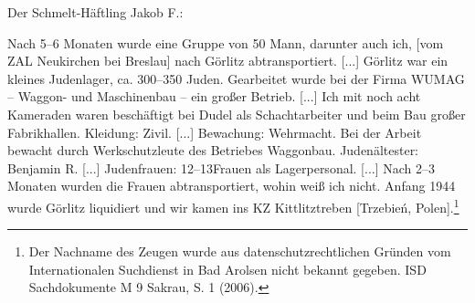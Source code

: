 Der Schmelt-Häftling Jakob F.:
\begin{leftbar}
Nach 5--6 Monaten wurde eine Gruppe von 50 Mann, darunter auch ich, [vom ZAL Neukirchen bei Breslau] nach Görlitz abtransportiert. [...] Görlitz war ein kleines Judenlager, ca. 300--350 Juden. Gearbeitet wurde bei der Firma WUMAG -- Waggon- und Maschinenbau -- ein großer Betrieb. [...] Ich mit noch acht Kameraden waren beschäftigt bei Dudel als Schachtarbeiter und beim Bau großer Fabrikhallen. Kleidung: Zivil. [...] Bewachung: Wehrmacht. Bei der Arbeit bewacht durch Werkschutzleute des Betriebes Waggonbau. Judenältester: Benjamin R. [...] Judenfrauen: 12--13Frauen als Lagerpersonal. [...] Nach 2--3 Monaten wurden die Frauen abtransportiert, wohin weiß ich nicht. Anfang 1944 wurde Görlitz liquidiert und wir kamen ins KZ Kittlitztreben [Trzebień, Polen].\footnote{Der Nachname des Zeugen wurde aus datenschutzrechtlichen Gründen vom Internationalen Suchdienst in Bad Arolsen nicht bekannt gegeben. ISD Sachdokumente M 9 Sakrau, S. 1 (2006).}
\end{leftbar}

